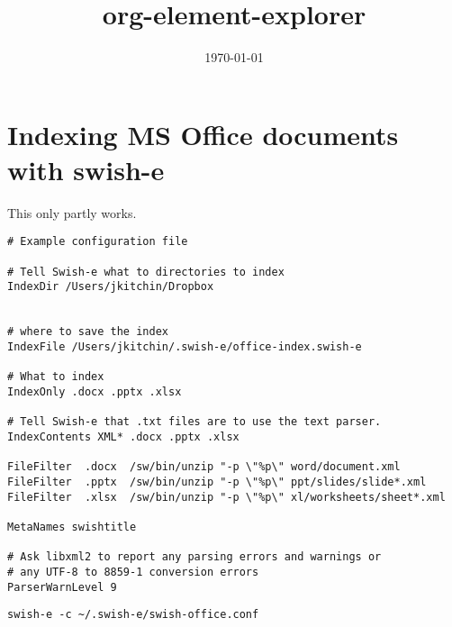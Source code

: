 \documentclass[11pt]{article}
\date{\today}
\title{org-element-explorer}
\begin{document}
\section{Indexing MS Office documents with swish-e}
\label{sec-1}

This only partly works.
\begin{verbatim}
# Example configuration file

# Tell Swish-e what to directories to index
IndexDir /Users/jkitchin/Dropbox


# where to save the index
IndexFile /Users/jkitchin/.swish-e/office-index.swish-e

# What to index
IndexOnly .docx .pptx .xlsx

# Tell Swish-e that .txt files are to use the text parser.
IndexContents XML* .docx .pptx .xlsx

FileFilter  .docx  /sw/bin/unzip "-p \"%p\" word/document.xml
FileFilter  .pptx  /sw/bin/unzip "-p \"%p\" ppt/slides/slide*.xml
FileFilter  .xlsx  /sw/bin/unzip "-p \"%p\" xl/worksheets/sheet*.xml

MetaNames swishtitle

# Ask libxml2 to report any parsing errors and warnings or
# any UTF-8 to 8859-1 conversion errors
ParserWarnLevel 9
\end{verbatim}



\begin{verbatim}
swish-e -c ~/.swish-e/swish-office.conf
\end{verbatim}
\end{document}
